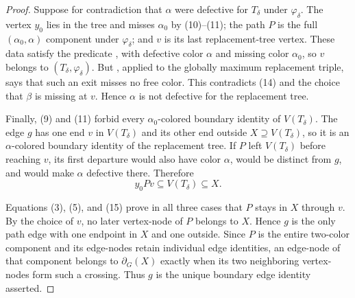 \begin{proof}
Suppose for contradiction that $\alpha$ were defective for
$T_\delta$ under $\varphi_\delta$.  The vertex $y_0$ lies in the tree and
misses $\alpha_0$ by (10)--(11); the path $P$ is the full
$(\alpha_0,\alpha)$ component under $\varphi_\delta$; and $v$ is its last
replacement-tree vertex.  These data satisfy the predicate
, with defective color $\alpha$ and missing
color $\alpha_0$, so $v$ belongs to
$(T_\delta,\varphi_\delta)$.  But
, applied to the globally maximum replacement
triple, says that such an exit misses no free color.  This contradicts
(14) and the choice that $\beta$ is missing at $v$.  Hence $\alpha$ is
not defective for the replacement tree.

Finally, (9) and (11) forbid every $\alpha_0$-colored boundary identity
of $V(T_\delta)$.  The edge $g$ has one end $v$ in $V(T_\delta)$ and its
other end outside $X\supseteq V(T_\delta)$, so it is an
$\alpha$-colored boundary identity of the replacement tree.  If $P$
left $V(T_\delta)$ before reaching $v$, its first departure would also
have color $\alpha$, would be distinct from $g$, and would make $\alpha$
defective there.  Therefore
\[
 y_0Pv\subseteq V(T_\delta)\subseteq X.                      \tag{15}
\]

Equations (3), (5), and (15) prove in all three cases that $P$ stays in
$X$ through $v$.  By the choice of $v$, no later vertex-node of $P$
belongs to $X$.  Hence $g$ is the only path edge with one endpoint in
$X$ and one outside.  Since $P$ is the entire two-color component and
its edge-nodes retain individual edge identities, an edge-node of that
component belongs to $\partial_G(X)$ exactly when its two neighboring
vertex-nodes form such a crossing.  Thus $g$ is the unique boundary edge
identity asserted.
\end{proof}
